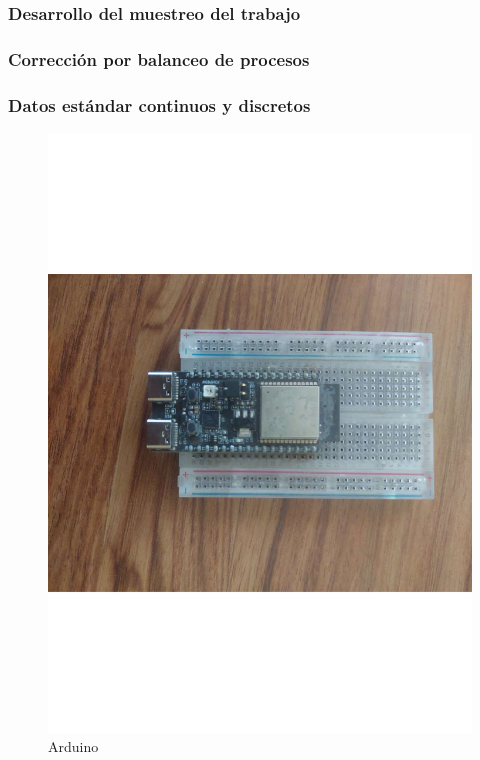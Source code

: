 \subsubsection{Desarrollo del muestreo del trabajo}
%
%
\subsubsection{Corrección por balanceo de procesos}
%
%
\subsubsection{Datos estándar continuos y discretos}
%
%
\begin{figure}[H]
        \centering
        \includegraphics[trim = {40mm 120mm 50mm 100mm},clip,scale=0.2]{10/Img/arduino.pdf}
        \caption{Arduino}
        \label{Arduino}
    \end{figure}

